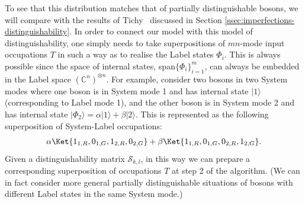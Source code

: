 To see that this distribution matches that of partially distinguishable bosons, we will compare with the results of Tichy~\cite{tichy2015} discussed in Section \ref{ssec:imperfections-distinguishability}. In order to connect our model with this model of distinguishability, one simply needs to take superpositions of $mn$-mode input occupations $T$ in such a way as to realise the Label states $\Phi_i$.
This is always possible since the space of internal states, span$\{\Phi_i\}_{i=1}^m$, can always be embedded in the Label space $(\mathbb{C}^n)^{\otimes n}$.
For example, consider two bosons in two System modes where one boson is in System mode 1 and has internal state $|1\rangle$ (corresponding to Label mode 1), and the other boson is in System mode 2 and has internal state $|\Phi_2\rangle=\alpha|1\rangle+\beta|2\rangle$.
This is represented as the following superposition of System-Label occupations:
\begin{align}
\alpha \Ket{1_{1,R}, 0_{1,G}, 1_{2,R}, 0_{2,G}} + \beta \Ket{1_{1,R}, 0_{1,G}, 0_{2,R}, 1_{2,G}} .
\end{align}
Given a distinguishability matrix $\mathcal{S}_{k,l}$, in this way we can prepare a corresponding superposition of occupations $T$ at step 2 of the algorithm.
(We can in fact consider more general partially distinguishable situations of bosons with different Label states in the same System mode.)

